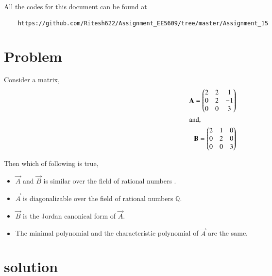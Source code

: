 \documentclass[journal,12pt,twocolumn]{IEEEtran}
\begin{document}
	
	\maketitle
	\newpage
	\bigskip
	\renewcommand{\thefigure}{\theenumi}
	\renewcommand{\thetable}{\theenumi}
	\date{Today}
	
	
	All the codes for this document can be found at
	\begin{lstlisting}
	https://github.com/Ritesh622/Assignment_EE5609/tree/master/Assignment_15
	\end{lstlisting}
	\section{Problem}
	Consider a matrix,
	\begin{align}
	\mathbf{A} = \begin{pmatrix}2 & 2 & 1 \\0 & 2 & -1 \\ 0 & 0 & 3\end{pmatrix}\\
\intertext{and,}
\mathbf{B} = \begin{pmatrix}2 & 1 & 0 \\ 0 & 2 & 0 \\ 0 & 0 & 3\end{pmatrix}
	\end{align}
	
Then which of following is true,
\begin{itemize}
\item $\vec{A}$ and $\vec{B}$ is similar over the field of rational numbers .
\item $\vec{A}$ is diagonalizable over the field of rational numbers $\mathbb{Q}$.
\item $\vec{B}$ is the Jordan canonical form of $\vec{A}$.
\item The minimal polynomial and the characteristic polynomial of $\vec{A}$ are the same.
\end{itemize}
	\section{solution}
\end{document}
